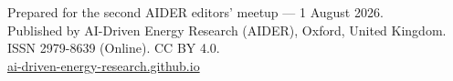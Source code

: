 \documentclass[11pt]{article}
\begin{document}
\vspace{5pt}
\begin{center}
{\footnotesize\color{ink3} Prepared for the second AIDER editors' meetup --- 1 August 2026.\\
Published by AI-Driven Energy Research (AIDER), Oxford, United Kingdom. ISSN 2979-8639 (Online). CC BY 4.0.\\
\href{https://ai-driven-energy-research.github.io/}{ai-driven-energy-research.github.io}}
\end{center}
\end{document}
